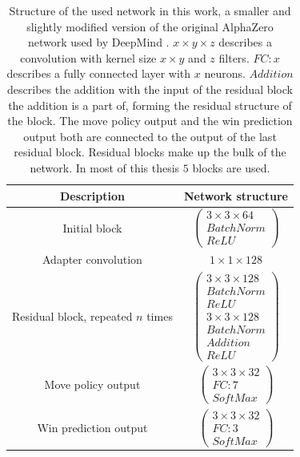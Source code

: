 \documentclass[12pt,onecolumn,oneside,titlepage]{article}
\begin{document}
\begin{table} [H]
 \centering
  \begin{tabular}{c | c }
   Description & Network structure \\
   \hline
   \hline
   Initial block & $\begin{pmatrix} 3 \times 3 \times 64 \\ BatchNorm \\ ReLU \end{pmatrix}$ \\
   \hline
   Adapter convolution & $1 \times 1 \times 128$ \\
   \hline
   Residual block, repeated $n$ times & $\begin{pmatrix} 3 \times 3 \times 128 \\ BatchNorm \\ ReLU \\ 3 \times 3 \times 128 \\ BatchNorm \\ Addition \\ ReLU \end{pmatrix}$ \\
   \hline 
   Move policy output & $\begin{pmatrix} 3 \times 3 \times 32 \\ FC: 7 \\ SoftMax \end{pmatrix}$ \\
   \hline
   Win prediction output & $\begin{pmatrix} 3 \times 3 \times 32 \\ FC: 3 \\ SoftMax \end{pmatrix}$
  \end{tabular}
  \caption{Structure of the used network in this work, a smaller and slightly modified version of the original AlphaZero network used by DeepMind \cite{silver2018general}.
  $x \times y \times z$ describes a convolution with kernel size $x \times y$ and $z$ filters. $FC: x$ describes a fully connected layer with $x$ neurons. $Addition$ describes the addition with the input of the residual block the addition is a part of, forming the residual structure of the block.
  The move policy output and the win prediction output both are connected 
  to the output of the last residual block. Residual blocks make up the bulk of the network. In most of this thesis $5$ blocks are used.}
  \label{fig:blocks_network}
\end{table}
\end{document}
